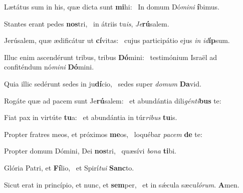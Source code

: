 \item Lætátus sum in his, quæ dicta sunt \textbf{mi}hi:~\psstar{} In domum Dó\textit{mi}\textit{ni} \textbf{í}bimus.

\item Stantes erant pedes \textbf{nos}tri,~\psstar{} in átriis tu\textit{is}, \textit{Je}\textbf{rú}salem.

\item Jerúsalem, quæ ædificátur ut \textbf{cí}vitas:~\psstar{} cujus participátio ejus \textit{in} \textit{id}\textbf{íp}sum.

\item Illuc enim ascendérunt tribus, tribus \textbf{Dó}mini:~\psstar{} testimónium Israël ad confiténdum nó\textit{mi}\textit{ni} \textbf{Dó}mini.

\item Quia illic sedérunt sedes in ju\textbf{dí}cio,~\psstar{} sedes super \textit{do}\textit{mum} \textbf{Da}vid.

\item Rogáte quæ ad pacem sunt Je\textbf{rú}salem:~\psstar{} et abundántia dili\textit{gén}\textit{ti}\textbf{bus} te:

\item Fiat pax in virtúte \textbf{tu}a:~\psstar{} et abundántia in túr\textit{ri}\textit{bus} \textbf{tu}is.

\item Propter fratres meos, et próximos \textbf{me}os,~\psstar{} loquébar \textit{pa}\textit{cem} \textbf{de} te:

\item Propter domum Dómini, Dei \textbf{nos}tri,~\psstar{} quæsívi \textit{bo}\textit{na} \textbf{ti}bi.

\item Glória Patri, et \textbf{Fí}lio,~\psstar{} et Spirí\textit{tu}\textit{i} \textbf{Sanc}to.

\item Sicut erat in princípio, et nunc, et \textbf{sem}per,~\psstar{} et in sǽcula sæcu\textit{ló}\textit{rum}. \textbf{A}men.